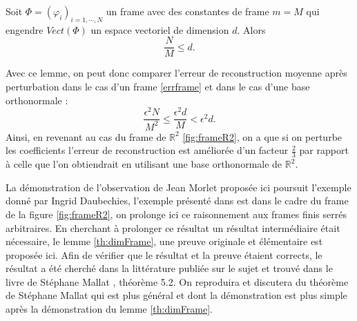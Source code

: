 \begin{lemme}\label{th:dimFrame}
	Soit $\Phi =(\varphi_i)_{i=1, \cdots, N}$ un frame avec des constantes de frame $m=M$ qui engendre $Vect(\Phi)$ un espace vectoriel de dimension $d$.
	Alors
	\begin{equation}
		\frac{N}{M} \leq d.
	\end{equation}
\end{lemme}
Avec ce lemme, on peut donc comparer l'erreur de reconstruction moyenne après perturbation dans le cas d'un frame \ref{errframe} et dans le cas d'une base orthonormale :
\begin{equation}
	\frac{\epsilon^2N}{M^2} \leq \frac{\epsilon^2d}{M} < \epsilon^2 d.
\end{equation}
Ainsi, en revenant au cas du frame de $\mathbb{R}^2$ \ref{fig:frameR2}, on a que si on perturbe les coefficients l'erreur de reconstruction est améliorée d'un facteur $\frac{2}{3}$ par rapport à celle que l'on obtiendrait en utilisant une base orthonormale de $\mathbb{R}^2$.
\begin{remarque}\label{rq:lemmemallat}
La démonstration de l'observation de Jean Morlet proposée ici poursuit l'exemple donné par Ingrid Daubechies, l'exemple présenté dans \cite{daubch3} est dans le cadre du frame de la figure \ref{fig:frameR2}, on prolonge ici ce raisonnement aux frames finis serrés arbitraires.
En cherchant à prolonger ce résultat un résultat intermédiaire était nécessaire, le lemme \ref{th:dimFrame}, une preuve originale et élémentaire est proposée ici.
Afin de vérifier que le résultat et la preuve étaient corrects, le résultat a été cherché dans la littérature publiée sur le sujet et trouvé dans le livre de Stéphane Mallat \cite{mallatframe}, théorème 5.2.
On reproduira et discutera du théorème de Stéphane Mallat qui est plus général et dont la démonstration est plus simple après la démonstration du lemme \ref{th:dimFrame}.
\end{remarque}
